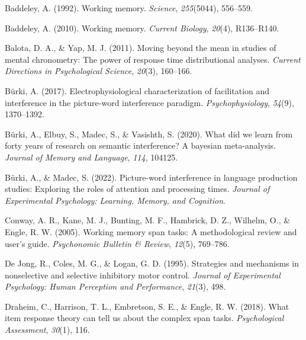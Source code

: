 \documentclass[
  man,floatsintext]{apa6}
\newlength{\cslhangindent}
\newlength{\cslentryspacingunit} %
\newenvironment{CSLReferences}[2] %
 {%
  \setlength{\parindent}{0pt}
  \ifodd #1
  \let\oldpar\par
  \def\par{\hangindent=\cslhangindent\oldpar}
  \fi
  \setlength{\parskip}{#2\cslentryspacingunit}
 }%
 {}
\begin{document}
\hypertarget{refs}{}
\begin{CSLReferences}{1}{0}
\leavevmode{}%
Baddeley, A. (1992). Working memory. \emph{Science}, \emph{255}(5044), 556--559.

\leavevmode{}%
Baddeley, A. (2010). Working memory. \emph{Current Biology}, \emph{20}(4), R136--R140.

\leavevmode{}%
Balota, D. A., \& Yap, M. J. (2011). Moving beyond the mean in studies of mental chronometry: The power of response time distributional analyses. \emph{Current Directions in Psychological Science}, \emph{20}(3), 160--166.

\leavevmode{}%
Bürki, A. (2017). Electrophysiological characterization of facilitation and interference in the picture-word interference paradigm. \emph{Psychophysiology}, \emph{54}(9), 1370--1392.

\leavevmode{}%
Bürki, A., Elbuy, S., Madec, S., \& Vasishth, S. (2020). What did we learn from forty years of research on semantic interference? A bayesian meta-analysis. \emph{Journal of Memory and Language}, \emph{114}, 104125.

\leavevmode{}%
Bürki, A., \& Madec, S. (2022). Picture-word interference in language production studies: Exploring the roles of attention and processing times. \emph{Journal of Experimental Psychology: Learning, Memory, and Cognition}.

\leavevmode{}%
Conway, A. R., Kane, M. J., Bunting, M. F., Hambrick, D. Z., Wilhelm, O., \& Engle, R. W. (2005). Working memory span tasks: A methodological review and user's guide. \emph{Psychonomic Bulletin \& Review}, \emph{12}(5), 769--786.

\leavevmode{}%
De Jong, R., Coles, M. G., \& Logan, G. D. (1995). Strategies and mechanisms in nonselective and selective inhibitory motor control. \emph{Journal of Experimental Psychology: Human Perception and Performance}, \emph{21}(3), 498.

\leavevmode{}%
Draheim, C., Harrison, T. L., Embretson, S. E., \& Engle, R. W. (2018). What item response theory can tell us about the complex span tasks. \emph{Psychological Assessment}, \emph{30}(1), 116.


\end{CSLReferences}
\end{document}
